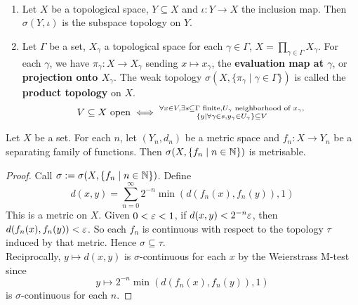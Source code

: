 \documentclass{article}
\begin{document}
\begin{egs*}~
  \begin{enumerate}
    \item Let $X$ be a topological space, $Y \subseteq X$ and $\iota : Y \to X$ the inclusion map. Then $\sigma(Y, {\iota})$ is the subspace topology on $Y$.
    \item Let $\Gamma$ be a set, $X_\gamma$ a topological space for each $\gamma \in \Gamma$, $X = \prod_{\gamma \in \Gamma} X_\gamma$. For each $\gamma$, we have $\pi_\gamma : X \to X_\gamma$ sending $x \mapsto x_\gamma$, the {\bf evaluation map at $\gamma$}, or {\bf projection onto $X_\gamma$}. The weak topology $\sigma(X, \{\pi_\gamma \mid \gamma \in \Gamma\})$ is called the {\bf product topology} on $X$.
    $$V \subseteq X \text{ open} \iff \substack{\forall x \in V, \exists s \subseteq \Gamma \text{ finite}, U_\gamma \text{ neighborhood of } x_\gamma, \\ \{y \mid \forall \gamma \in s, y_\gamma \in U_\gamma\} \subseteq V}$$
  \end{enumerate}
\end{egs*}

\begin{prop}\label{prop:lcs-metrisable}
  Let $X$ be a set. For each $n$, let $(Y_n, d_n)$ be a metric space and $f_n : X \to Y_n$ be a separating family of functions. Then $\sigma(X, \{f_n \mid n \in \mathbb N\})$ is metrisable.
\end{prop}
\begin{proof}
  Call $\sigma := \sigma(X, \{f_n \mid n \in \mathbb N\})$. Define
  $$d(x, y) = \sum_{n = 0}^\infty 2^{-n}\min(d(f_n(x), f_n(y)), 1)$$
  This is a metric on $X$. Given $0 < \varepsilon < 1$, if $d(x, y) < 2^{-n}\varepsilon$, then $d(f_n(x), f_n(y)) < \varepsilon$. So each $f_n$ is continuous with respect to the topology $\tau$ induced by that metric. Hence $\sigma \subseteq \tau$. \\
  Reciprocally, $y \mapsto d(x, y)$ is $\sigma$-continuous for each $x$ by the Weierstrass M-test since
  $$y \mapsto 2^{-n}\min(d(f_n(x), f_n(y)), 1)$$
  is $\sigma$-continuous for each $n$.
\end{proof}
\end{document}
